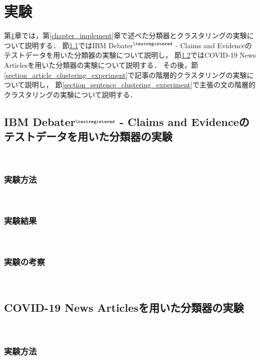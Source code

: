 \documentclass[12pt,a4j]{jreport}
\begin{document}
\chapter{実験}
\label{chapter_experiment}

第\ref{chapter_experiment}章では，第\ref{chapter_implement}章で述べた分類器とクラスタリングの実験について説明する．
節\ref{section_ibm_classification_experiment}ではIBM Debater$^{\textregistered}$ - Claims and Evidenceのテストデータを用いた分類器の実験について説明し，
節\ref{section_covid_classification_experiment}ではCOVID-19 News Articlesを用いた分類器の実験について説明する．
その後，節\ref{section_article_clustering_experiment}で記事の階層的クラスタリングの実験について説明し，
節\ref{section_sentence_clustering_experiment}で主張の文の階層的クラスタリングの実験について説明する．

\section{IBM Debater$^{\textregistered}$ - Claims and Evidenceのテストデータを用いた分類器の実験}
\label{section_ibm_classification_experiment}
~

\subsection{実験方法}
~

\subsection{実験結果}
~

\subsection{実験の考察}
~

\section{COVID-19 News Articlesを用いた分類器の実験}
\label{section_covid_classification_experiment}
~

\subsection{実験方法}
~
\end{document}
